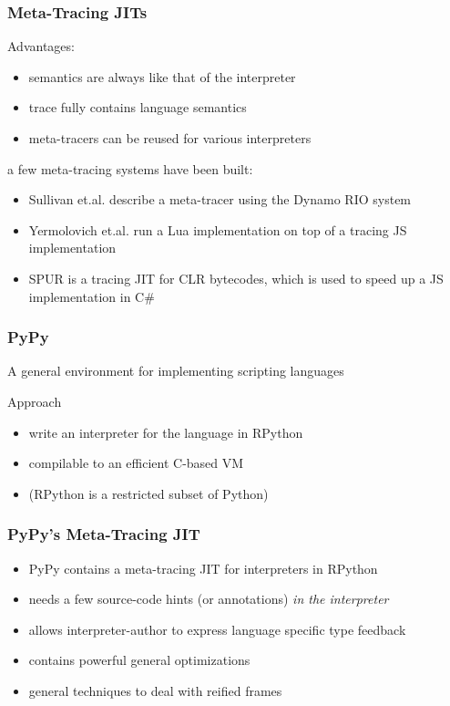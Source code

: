 \documentclass[utf8x]{beamer}
\begin{document}
\begin{frame}
  \frametitle{Meta-Tracing JITs}
  \begin{block}{Advantages:}
    \begin{itemize}
        \item semantics are always like that of the interpreter
        \item trace fully contains language semantics
        \item meta-tracers can be reused for various interpreters
    \end{itemize}
  \end{block}
  \pause
  a few meta-tracing systems have been built:
  \begin{itemize}
      \item Sullivan et.al. describe a meta-tracer using the Dynamo RIO system
      \item Yermolovich et.al. run a Lua implementation on top of a tracing JS implementation
      \item SPUR is a tracing JIT for CLR bytecodes, which is used to speed up a JS implementation in C\#
  \end{itemize}
\end{frame}

\begin{frame}
  \frametitle{PyPy}
  A general environment for implementing scripting languages
  \pause
  \begin{block}{Approach}
      \begin{itemize}
          \item write an interpreter for the language in RPython
          \item compilable to an efficient C-based VM
          \pause
          \item (RPython is a restricted subset of Python)
      \end{itemize}
  \end{block}
  \pause
\end{frame}

\begin{frame}
  \frametitle{PyPy's Meta-Tracing JIT}
  \begin{itemize}
      \item PyPy contains a meta-tracing JIT for interpreters in RPython
      \item needs a few source-code hints (or annotations) \emph{in the interpreter}
      \item allows interpreter-author to express language specific type feedback
      \item contains powerful general optimizations
      \pause
      \item general techniques to deal with reified frames
  \end{itemize}
\end{frame}
\end{document}
